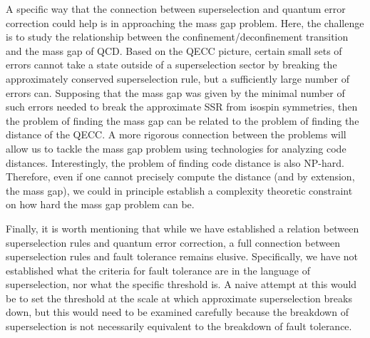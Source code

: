 \documentclass[11pt,english]{article}
\begin{document}
A specific way that the connection between superselection and quantum error correction could help is in approaching the mass gap problem. Here, the challenge is to study the relationship between the confinement/deconfinement transition and the mass gap of QCD. Based on the QECC picture, certain small sets of errors cannot take a state outside of a superselection sector by breaking the approximately conserved superselection rule, but a sufficiently large number of errors can. Supposing that the mass gap was given by the minimal number of such errors needed to break the approximate SSR from isospin symmetries, then the problem of finding the mass gap can be related to the problem of finding the distance of the QECC. A more rigorous connection between the problems will allow us to tackle the mass gap problem using technologies for analyzing code distances. Interestingly, the problem of finding code distance is also NP-hard\cite{mindist}. Therefore, even if one cannot precisely compute the distance (and by extension, the mass gap), we could in principle establish a complexity theoretic constraint on how hard the mass gap problem can be. 




Finally, it is worth mentioning that while we have established a relation between superselection rules and quantum error correction, a full connection between superselection rules and fault tolerance remains elusive. Specifically, we have not established what the criteria for fault tolerance are in the language of superselection, nor what the specific threshold is. A naive attempt at this would be to set the threshold at the scale at which approximate superselection breaks down, but this would need to be examined carefully because the breakdown of superselection is not necessarily equivalent to the breakdown of fault tolerance.

 
\end{document}
